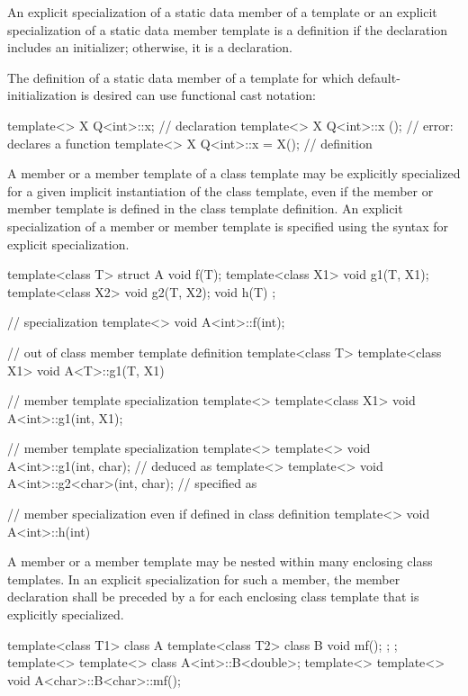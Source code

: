 \pnum
An explicit specialization of a static data member of a template
or an explicit specialization of a static data member template is a
definition if the declaration includes an initializer;
otherwise, it is a declaration.
\begin{note}
The definition of a static data member of a template
for which default-initialization is desired
can use functional cast notation:
\begin{codeblock}
template<> X Q<int>::x;                         // declaration
template<> X Q<int>::x ();                      // error: declares a function
template<> X Q<int>::x = X();                   // definition
\end{codeblock}
\end{note}

\pnum
A member or a member template of a class template may be explicitly specialized
for a given implicit instantiation of the class template, even if the member
or member template is defined in the class template definition.
An explicit specialization of a member or member template is specified using the
syntax for explicit specialization.
\begin{example}
\begin{codeblock}
template<class T> struct A {
  void f(T);
  template<class X1> void g1(T, X1);
  template<class X2> void g2(T, X2);
  void h(T) { }
};

// specialization
template<> void A<int>::f(int);

// out of class member template definition
template<class T> template<class X1> void A<T>::g1(T, X1) { }

// member template specialization
template<> template<class X1> void A<int>::g1(int, X1);

// member template specialization
template<> template<>
  void A<int>::g1(int, char);           //  deduced as 
template<> template<>
  void A<int>::g2<char>(int, char);     //  specified as 

// member specialization even if defined in class definition
template<> void A<int>::h(int) { }
\end{codeblock}
\end{example}

\pnum
A member or a member template may be nested within many enclosing class
templates.
In an explicit specialization for such a member,
the member declaration shall be preceded by a
for each enclosing class template that is explicitly specialized.
\begin{example}
\begin{codeblock}
template<class T1> class A {
  template<class T2> class B {
    void mf();
  };
};
template<> template<> class A<int>::B<double>;
template<> template<> void A<char>::B<char>::mf();
\end{codeblock}
\end{example}

